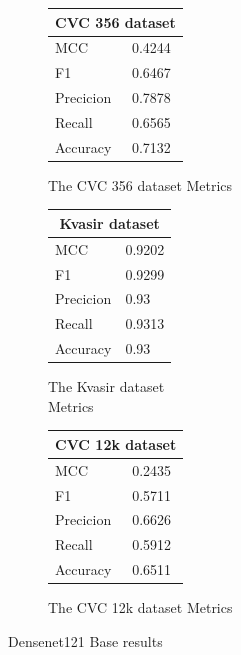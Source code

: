 \begin{figure}[h]
\vspace{1cm}

\begin{subfigure}[t]{0.25\textwidth}
\begin{tabular}{ll}      
        \toprule
        \multicolumn{2}{c}{CVC 356 dataset}        \\
        \midrule
        MCC 		& 0.4244 \\
        F1  		& 0.6467 \\
        Precicion  	& 0.7878 \\
        Recall     	& 0.6565 \\
        Accuracy	& 0.7132 \\
        \bottomrule
        \end{tabular}
\caption{The CVC 356 dataset Metrics}
\label{tab:cvc356_metrics_DN121_base}
\end{subfigure}%
\begin{subfigure}[t]{0.49\textwidth}
    	\centering
        \begin{tabular}{ll}
        \toprule
        \multicolumn{2}{c}{Kvasir dataset}        \\
        \midrule
        MCC 		& 0.9202 \\
        F1  		& 0.9299 \\
        Precicion  	& 0.93 \\
        Recall     	& 0.9313  \\
        Accuracy	& 0.93 \\
        
        \bottomrule
\end{tabular}
\caption{The Kvasir dataset\\ Metrics}
\label{tab:kvasir_metrics_DN121_base}
\end{subfigure}%
\begin{subfigure}[t]{0.25\textwidth}
        \begin{tabular}{ll}
        \toprule
        \multicolumn{2}{c}{CVC 12k dataset}        \\
        \midrule
        MCC 		& 0.2435  \\
        F1  		& 0.5711 \\
        Precicion  	& 0.6626 \\
        Recall     	& 0.5912 \\
        Accuracy	& 0.6511 \\
        \bottomrule
        \end{tabular}
\caption{The CVC 12k dataset Metrics}
\label{tab:cvc12k_metrics_DN121_base}
\end{subfigure}
\caption{Densenet121 Base results}
\label{fig:results_DN121_base}
\end{figure}



